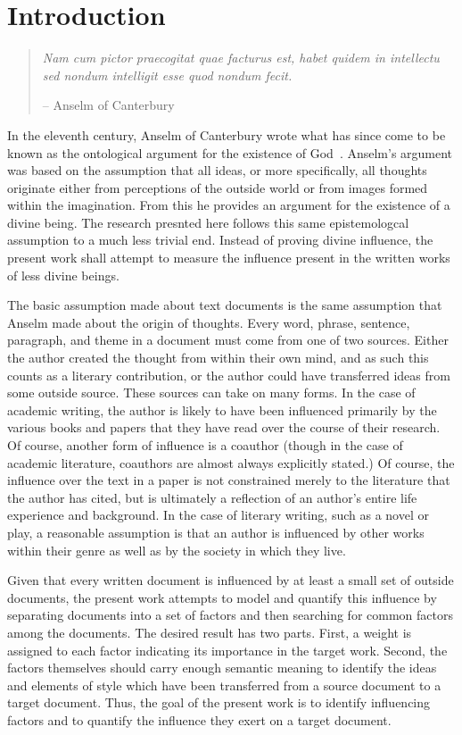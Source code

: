\documentclass[../dissertation.tex]{subfiles}
\begin{document}
\chapter{Introduction}
\begin{quote}
\textit{Nam cum pictor praecogitat quae facturus est, habet quidem in
intellectu sed nondum intelligit esse quod nondum fecit.}

-- Anselm of Canterbury~\cite{anselm}
\end{quote}
In the eleventh century, Anselm of Canterbury wrote what has since
come to be known as the ontological argument for the existence of
God~\cite{anselm}.  Anselm's argument was based on the assumption that
all ideas, or more specifically, all thoughts originate either from
perceptions of the outside world or from images formed within the
imagination.  From this he provides an argument for the existence of
a divine being.  The research presnted here follows this same
epistemologcal assumption to a much less trivial end.
Instead of proving divine influence, the present work shall attempt to
measure the influence present in the written works of less divine beings.

The basic assumption made about text documents is the same assumption
that Anselm made about the origin of thoughts.  Every word, phrase,
sentence, paragraph, and theme in a document must come from one of two
sources.  Either the author created the thought from within their own
mind, and as such this counts as a literary contribution, or the
author could have transferred ideas from some outside source.  These
sources can take on many forms.  In the case of academic writing, the
author is likely to have been influenced primarily by the various
books and papers that they have read over the course of their
research.  Of course, another form of influence is a coauthor (though
in the case of academic literature, coauthors are almost always
explicitly stated.)  Of course, the influence over the text in a paper
is not constrained merely to the literature that the author has cited,
but is ultimately a reflection of an author's entire life experience
and background.  In the case of literary writing, such as a novel or
play, a reasonable assumption is that an author is influenced by other
works within their genre as well as by the society in which they live.

Given that every written document is influenced by at least a small
set of outside documents, the present work attempts to model and
quantify this influence by separating documents into a set of factors
and then searching for common factors among the documents.  The
desired result has two parts.  First, a weight is assigned to each
factor indicating its importance in the target work.  Second, the
factors themselves should carry enough semantic meaning to identify
the ideas and elements of style which have been transferred from a
source document to a target document.  Thus, the goal of the present
work is to identify influencing factors and to quantify the influence
they exert on a target document.
\end{document}
